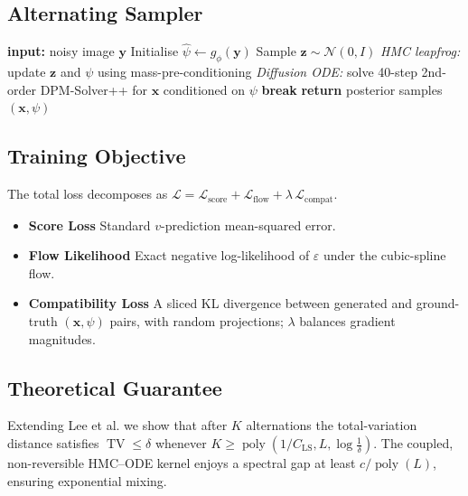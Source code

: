 \documentclass{article} %
\begin{document}
\subsection{Alternating Sampler}
\begin{algorithm}[H]
  \caption{UNAD-2.0 Alternating Sampler}
  \begin{algorithmic}[1]
    \State \textbf{input:} noisy image \(\mathbf{y}\)
    \State Initialise \(\hat{\psi}\leftarrow g_{\phi}(\mathbf{y})\)
      \State Sample \(\mathbf{z}\sim \mathcal{N}(0,I)\)
      \State \textit{HMC leapfrog:} update \(\mathbf{z}\) and \(\psi\) using mass-pre-conditioning
      \State \textit{Diffusion ODE:} solve 40-step 2nd-order DPM-Solver++ for \(\mathbf{x}\) conditioned on \(\psi\)
        \State \textbf{break}
      \EndIf
    \EndFor
    \State \textbf{return} posterior samples \((\mathbf{x},\psi)\)
  \end{algorithmic}
\end{algorithm}

\subsection{Training Objective}
The total loss decomposes as \(\mathcal{L}=\mathcal{L}_{\text{score}}+\mathcal{L}_{\text{flow}}+\lambda\,\mathcal{L}_{\text{compat}}\).
\begin{itemize}
  \item \textbf{Score Loss} Standard \(v\)-prediction mean-squared error.
  \item \textbf{Flow Likelihood} Exact negative log-likelihood of \(\varepsilon\) under the cubic-spline flow.
  \item \textbf{Compatibility Loss} A sliced KL divergence between generated and ground-truth \((\mathbf{x},\psi)\) pairs, with random projections; \(\lambda\) balances gradient magnitudes.
\end{itemize}

\subsection{Theoretical Guarantee}
Extending Lee et al. we show that after \(K\) alternations the total-variation distance satisfies \(\operatorname{TV}\leq\delta\) whenever \(K\geq\operatorname{poly}(1/C_{\mathrm{LS}},L,\log\tfrac{1}{\delta})\). The coupled, non-reversible HMC–ODE kernel enjoys a spectral gap at least \(c/\operatorname{poly}(L)\), ensuring exponential mixing.
\end{document}
